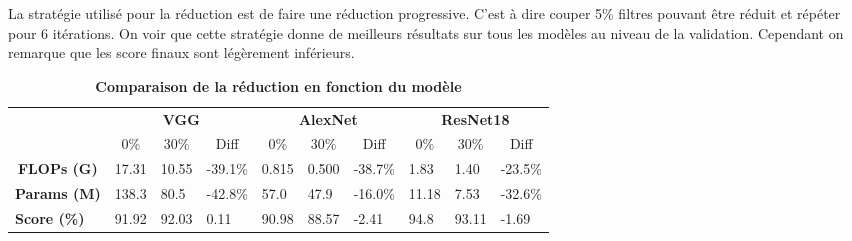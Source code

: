 \documentclass[12pt]{article}
\begin{document}
La stratégie utilisé pour la réduction est de faire une réduction progressive. C'est à dire couper 5\% filtres pouvant être réduit et répéter pour 6 itérations. On voir que cette stratégie donne de meilleurs résultats sur tous les modèles au niveau de la validation. Cependant on remarque que les score finaux sont légèrement inférieurs.
\begin{table}[H]
	\caption {\textbf{Comparaison de la réduction en fonction du modèle}}
\begin{tabular}{cccccccccc}
	\multicolumn{1}{l}{\textbf{}}           & \multicolumn{3}{c}{\textbf{VGG}}                                                                            & \multicolumn{3}{c}{\textbf{AlexNet}}                                                                        & \multicolumn{3}{c}{\textbf{ResNet18}}                                                                      \\
	\multicolumn{1}{l}{}                    & 0\%                       & 30\%                      & Diff                                                & 0\%                       & 30\%                      & Diff                                                & 0\%                       & 30\%                      & Diff                                               \\ \cline{2-10} 
	\multicolumn{1}{c|}{\textbf{FLOPs (G)}}  & \multicolumn{1}{l}{17.31} & \multicolumn{1}{l}{10.55} & \multicolumn{1}{l|}{{\color[HTML]{009901} -39.1\%}} & \multicolumn{1}{l}{0.815} & \multicolumn{1}{l}{0.500} & \multicolumn{1}{l|}{{\color[HTML]{009901} -38.7\%}} & \multicolumn{1}{l}{1.83}  & \multicolumn{1}{l}{1.40}  & \multicolumn{1}{l}{{\color[HTML]{009901} -23.5\%}} \\
	\multicolumn{1}{c|}{\textbf{Params (M)}} & \multicolumn{1}{l}{138.3} & \multicolumn{1}{l}{80.5}  & \multicolumn{1}{l|}{{\color[HTML]{009901} -42.8\%}} & \multicolumn{1}{l}{57.0}  & \multicolumn{1}{l}{47.9}  & \multicolumn{1}{l|}{{\color[HTML]{009901} -16.0\%}} & \multicolumn{1}{l}{11.18} & \multicolumn{1}{l}{7.53}  & \multicolumn{1}{l}{{\color[HTML]{009901} -32.6\%}} \\
	\multicolumn{1}{l|}{\textbf{Score (\%)}} & \multicolumn{1}{l}{91.92} & \multicolumn{1}{l}{92.03} & \multicolumn{1}{l|}{{\color[HTML]{009901} 0.11}}    & \multicolumn{1}{l}{90.98} & \multicolumn{1}{l}{88.57} & \multicolumn{1}{l|}{{\color[HTML]{9A0000} -2.41}}   & \multicolumn{1}{l}{94.8}  & \multicolumn{1}{l}{93.11} & \multicolumn{1}{l}{{\color[HTML]{9A0000} -1.69}}   \\ \hline

\end{tabular}
\end{table}
\end{document}
